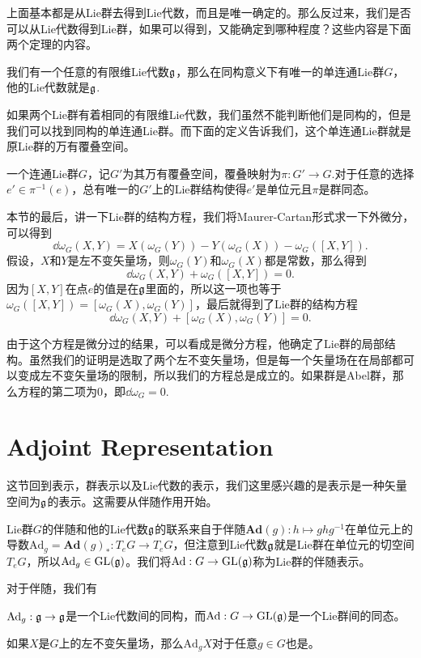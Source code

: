 上面基本都是从Lie群去得到Lie代数，而且是唯一确定的。那么反过来，我们是否可以从Lie代数得到Lie群，如果可以得到，又能确定到哪种程度？这些内容是下面两个定理的内容。

\theo 我们有一个任意的有限维Lie代数${\mathfrak{g}}$，那么在同构意义下有唯一的单连通Lie群$G$，他的Lie代数就是${\mathfrak{g}}$.

如果两个Lie群有着相同的有限维Lie代数，我们虽然不能判断他们是同构的，但是我们可以找到同构的单连通Lie群。而下面的定义告诉我们，这个单连通Lie群就是原Lie群的万有覆叠空间。

\theo 一个连通Lie群$G$，记$G'$为其万有覆叠空间，覆叠映射为$\pi:G'\to G$.对于任意的选择$e'\in \pi^{−1}(e)$，总有唯一的$G'$上的Lie群结构使得$e'$是单位元且$\pi$是群同态。

本节的最后，讲一下Lie群的结构方程，我们将Maurer-Cartan形式求一下外微分，可以得到
\[
\dd \omega_G(X,Y)=X(\omega_G(Y))-Y(\omega_G(X))-\omega_G([X,Y]).
\]
假设，$X$和$Y$是左不变矢量场，则$\omega_G(Y)$和$\omega_G(X)$都是常数，那么得到
\[
\dd \omega_G(X,Y)+\omega_G([X,Y])=0.
\]
因为$[X,Y]$在点$e$的值是在${\mathfrak{g}}$里面的，所以这一项也等于$\omega_G([X,Y])=[\omega_G(X),\omega_G(Y)]$，最后就得到了Lie群的结构方程
\[
\dd \omega_G(X,Y)+[\omega_G(X),\omega_G(Y)]=0.
\]

由于这个方程是微分过的结果，可以看成是微分方程，他确定了Lie群的局部结构。虽然我们的证明是选取了两个左不变矢量场，但是每一个矢量场在在局部都可以变成左不变矢量场的限制，所以我们的方程总是成立的。如果群是Abel群，那么方程的第二项为0，即$\dd \omega_G=0$.

\section{Adjoint Representation}

这节回到表示，群表示以及Lie代数的表示，我们这里感兴趣的是表示是一种矢量空间为${\mathfrak{g}}$的表示。这需要从伴随作用开始。

\para Lie群$G$的伴随和他的Lie代数${\mathfrak{g}}$的联系来自于伴随$\mathbf{Ad}(g):h\mapsto ghg^{-1}$在单位元上的导数$\mathrm{Ad}_g=\mathbf{Ad}(g)_*:T_eG\to T_eG$，但注意到Lie代数${\mathfrak{g}}$就是Lie群在单位元的切空间$T_eG$，所以$\mathrm{Ad}_g\in \mathrm{GL}({\mathfrak{g}})$。我们将$\mathrm{Ad}:G\to \mathrm{GL}({\mathfrak{g}})$称为Lie群的伴随表示。

对于伴随，我们有

 $\mathrm{Ad}_g:{\mathfrak{g}}\to {\mathfrak{g}}$是一个Lie代数间的同构，而$\mathrm{Ad}:G\to \mathrm{GL}({\mathfrak{g}})$是一个Lie群间的同态。

 如果$X$是$G$上的左不变矢量场，那么$\mathrm{Ad}_gX$对于任意$g\in G$也是。

